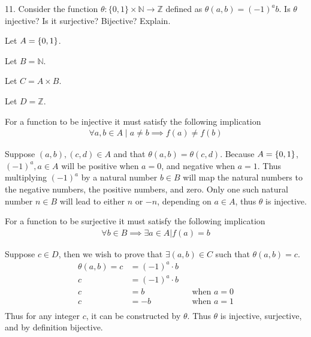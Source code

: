 \documentclass{idrisMemo}
\newcommand{\inj}{
\item For a function to be injective it must satisfy the following implication
\begin{align*}
    \forall a,b \in A\mid a\neq b\implies f(a)\neq f(b)
\end{align*}
}
\newcommand{\surj}{
\item For a function to be surjective it must satisfy the following implication
\begin{align*}
    \forall b \in B \implies \exists a \in A | f(a) = b
\end{align*}
}
\begin{document}
\begin{prooflist}{11. Consider the function $\theta:\{0,1\} \times \mathbb{N}
        \rightarrow \mathbb{Z}$ defined as \mbox{$\theta(a, b)=(-1)^a b$}. Is $\theta$
injective? Is it surjective? Bijective? Explain.}
\item Let $A=\{0,1\}$.
\item Let $B=\mathbb{N}$.
\item Let $C=A\times B$.
\item Let $D=\mathbb{Z}$.
\inj{}
\item Suppose $(a, b), (c, d) \in A$ and that $\theta(a, b)=\theta(c, d)$.
Because $A=\{0, 1\}$, $(-1)^a, a\in A$ will be positive when $a=0$, and
negative when $a=1$. Thus multiplying $(-1)^a$ by a natural number $b\in B$ will
map the natural numbers to the negative numbers, the positive numbers, and zero.
Only one such natural number $n\in B$ will lead to either $n$ or $-n$, depending on
$a\in A$, thus $\theta$ is injective.
\surj{}
\item Suppose $c\in D$, then we wish to prove that $\exists (a, b) \in C$ such
    that $\theta(a, b)=c$.
\begin{align*}
    \theta(a, b) = c &= (-1)^a\cdot b\\
    c &= (-1)^a\cdot b\\
c &= b && \text{when }a=0\\
c &= -b && \text{when }a=1\\
\end{align*}
Thus for any integer $c$, it can be constructed by $\theta$. Thus $\theta$
is injective, surjective, and by definition bijective.
\end{prooflist}
\end{document}

